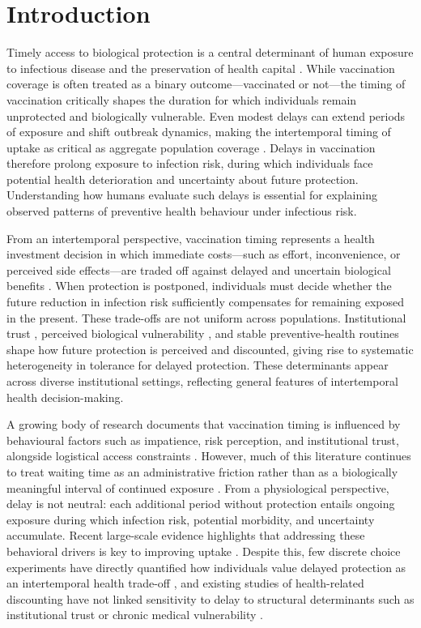\documentclass[preprint,12pt]{elsarticle}
\begin{document}
\clearpage

\section{Introduction}
\doublespacing
Timely access to biological protection is a central determinant of human exposure to infectious disease and the preservation of health capital \cite{Castioni2024, Shankar2024}. While vaccination coverage is often treated as a binary outcome—vaccinated or not—the timing of vaccination critically shapes the duration for which individuals remain unprotected and biologically vulnerable. Even modest delays can extend periods of exposure and shift outbreak dynamics, making the intertemporal timing of uptake as critical as aggregate population coverage \cite{Rasmussen2021}. Delays in vaccination therefore prolong exposure to infection risk, during which individuals face potential health deterioration and uncertainty about future protection. Understanding how humans evaluate such delays is essential for explaining observed patterns of preventive health behaviour under infectious risk.

From an intertemporal perspective, vaccination timing represents a health investment decision in which immediate costs—such as effort, inconvenience, or perceived side effects—are traded off against delayed and uncertain biological benefits \cite{Frederick2002}. When protection is postponed, individuals must decide whether the future reduction in infection risk sufficiently compensates for remaining exposed in the present. These trade-offs are not uniform across populations. Institutional trust \cite{Krastev2023}, perceived biological vulnerability \cite{Bok2024}, and stable preventive-health routines \cite{Kumar2025} shape how future protection is perceived and discounted, giving rise to systematic heterogeneity in tolerance for delayed protection. These determinants appear across diverse institutional settings, reflecting general features of intertemporal health decision-making.

A growing body of research documents that vaccination timing is influenced by behavioural factors such as impatience, risk perception, and institutional trust, alongside logistical access constraints \cite{Anderson2023, Robertson2024, Etowa2024}. However, much of this literature continues to treat waiting time as an administrative friction rather than as a biologically meaningful interval of continued exposure \cite{Lievre2024, Tran2025, Whitaker2026}. From a physiological perspective, delay is not neutral: each additional period without protection entails ongoing exposure during which infection risk, potential morbidity, and uncertainty accumulate. Recent large-scale evidence highlights that addressing these behavioral drivers is key to improving uptake \cite{Owens2026, Siram2024}. Despite this, few discrete choice experiments have directly quantified how individuals value delayed protection as an intertemporal health trade-off \cite{Yue2021, Gong2020}, and existing studies of health-related discounting have not linked sensitivity to delay to structural determinants such as institutional trust or chronic medical vulnerability \cite{vanderPol2001}. 
\end{document}

